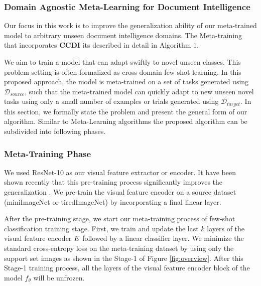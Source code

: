\subsubsection{Domain Agnostic Meta-Learning for Document Intelligence}
Our focus in this work is to improve the generalization ability of our meta-trained model to arbitrary unseen document intelligence domains. The Meta-training that incorporates \textbf{CCDI} its described in detail in Algorithm 1.

We aim to train a model that can adapt swiftly to novel unseen classes. This problem setting is often formalized as cross domain few-shot learning. In this proposed approach, the model is meta-trained on a set
of tasks generated using $\mathcal{D}_{source}$, such that the meta-trained model can quickly adapt to new unseen novel tasks using only a small number of examples or trials  generated using $\mathcal{D}_{target}$. In this section, we formally state the problem and present the general form of our algorithm. Similar to Meta-Learning algorithms the proposed algorithm can be subdivided into following phases.\\

\subsubsection{Meta-Training Phase}
We used ResNet-10 as our visual feature extractor or encoder. It have been shown recently that this pre-training process significantly improves the generalization \citep{rusu2018meta,gidaris2018dynamic,lifchitz2019dense}. We pre-train the visual feature encoder on a source dataset (miniImageNet or tiredImageNet) by incorporating a final linear layer.

After the pre-training stage, we start our meta-training process of few-shot classification training stage. First, we train and update the last $k$ layers of the visual feature encoder $\mathnormal{E}$ followed by a linear classifier layer. We minimize the standard cross-entropy loss on the meta-training dataset by using only the support set images as shown in the Stage-1 of Figure \ref{fig:overview}.  After this Stage-1 training process, all the layers of the visual feature encoder block of the model $f_{\theta}$ will be unfrozen.

